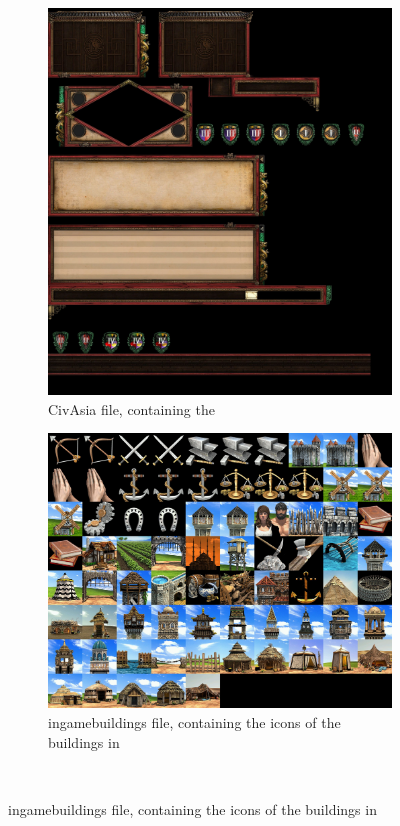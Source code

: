 \begin{appendices}
    \begin{figure}
        \centering
        \begin{subfigure}{0.48\textwidth}
            \centering
            \includegraphics[width=1.0\textwidth]{src/images/CivAsia}
            \caption{CivAsia file, containing the }
            \label{fig:CivAsia}
        \end{subfigure}\quad%
        \begin{subfigure}{0.48\textwidth}
            \centering
            \includegraphics[width=1.0\textwidth]{src/images/ingamebuildings}
            \caption{ingamebuildings file, containing the icons of the buildings in }
            \label{fig:ingamebuildings}
        \end{subfigure}\\%
    \end{figure}


\end{appendices}
